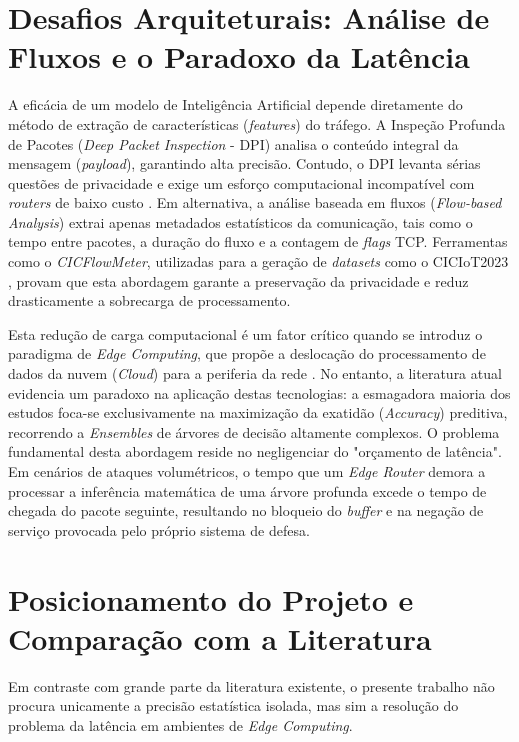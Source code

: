 \section{Desafios Arquiteturais: Análise de Fluxos e o Paradoxo da Latência}
\label{sec:ea_desafios_arquiteturais}
A eficácia de um modelo de Inteligência Artificial depende diretamente do método de extração de características (\textit{features}) do tráfego. A Inspeção Profunda de Pacotes (\textit{Deep Packet Inspection} - DPI) analisa o conteúdo integral da mensagem (\textit{payload}), garantindo alta precisão. Contudo, o DPI levanta sérias questões de privacidade e exige um esforço computacional incompatível com \textit{routers} de baixo custo \cite{IEEE_Anomalias_2021}. Em alternativa, a análise baseada em fluxos (\textit{Flow-based Analysis}) extrai apenas metadados estatísticos da comunicação, tais como o tempo entre pacotes, a duração do fluxo e a contagem de \textit{flags} TCP. Ferramentas como o \textit{CICFlowMeter}, utilizadas para a geração de \textit{datasets} como o CICIoT2023 \cite{CICIoT2023}, provam que esta abordagem garante a preservação da privacidade e reduz drasticamente a sobrecarga de processamento.

Esta redução de carga computacional é um fator crítico quando se introduz o paradigma de \textit{Edge Computing}, que propõe a deslocação do processamento de dados da nuvem (\textit{Cloud}) para a periferia da rede \cite{Chen2019}. No entanto, a literatura atual evidencia um paradoxo na aplicação destas tecnologias: a esmagadora maioria dos estudos foca-se exclusivamente na maximização da exatidão (\textit{Accuracy}) preditiva, recorrendo a \textit{Ensembles} de árvores de decisão altamente complexos. O problema fundamental desta abordagem reside no negligenciar do "orçamento de latência". Em cenários de ataques volumétricos, o tempo que um \textit{Edge Router} demora a processar a inferência matemática de uma árvore profunda excede o tempo de chegada do pacote seguinte, resultando no bloqueio do \textit{buffer} e na negação de serviço provocada pelo próprio sistema de defesa.

\section{Posicionamento do Projeto e Comparação com a Literatura}
\label{sec:ea_posicionamento}

Em contraste com grande parte da literatura existente, o presente trabalho não procura unicamente a precisão estatística isolada, mas sim a resolução do problema da latência em ambientes de \textit{Edge Computing}. 

